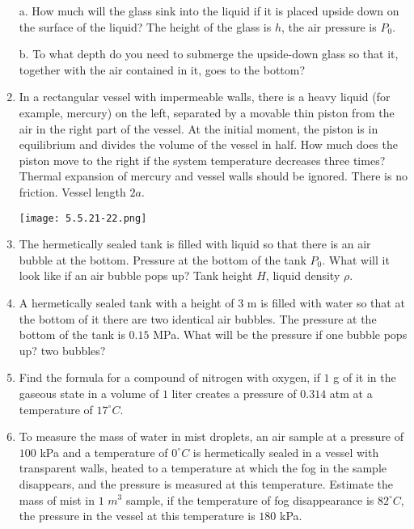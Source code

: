 \documentclass{article}
\begin{document}
\begin{enumerate}[label=5.5.\arabic*]
a. How much will the glass sink into the liquid if it is placed upside down on the surface of the liquid? The height of the glass is $h$, the air pressure is $P_0$.

b. To what depth do you need to submerge the upside-down glass so that it, together with the air contained in it, goes to the bottom?

\item In a rectangular vessel with impermeable walls, there is a heavy liquid (for example, mercury) on the left, separated by a movable thin piston from the air in the right part of the vessel. At the initial moment, the piston is in equilibrium and divides the volume of the vessel in half. How much does the piston move to the right if the system temperature decreases three times? Thermal expansion of mercury and vessel walls should be ignored. There is no friction. Vessel length $2a$.

\begin{center}
    \texttt{[image: 5.5.21-22.png]}
\end{center}


\item The hermetically sealed tank is filled with liquid so that there is an air bubble at the bottom. Pressure at the bottom of the tank $P_0$. What will it look like if an air bubble pops up? Tank height $H$, liquid density $\rho$.

\item A hermetically sealed tank with a height of $3$ m is filled with water so that at the bottom of it there are two identical air bubbles. The pressure at the bottom of the tank is $0.15$ MPa. What will be the pressure if one bubble pops up? two bubbles?

\item Find the formula for a compound of nitrogen with oxygen, if $1$ g of it in the gaseous state in a volume of $1$ liter creates a pressure of $0.314$ atm at a temperature of $17^\circ C$.

\item To measure the mass of water in mist droplets, an air sample at a pressure of $100$ kPa and a temperature of $0^\circ C$ is hermetically sealed in a vessel with transparent walls, heated to a temperature at which the fog in the sample disappears, and the pressure is measured at this temperature. Estimate the mass of mist in $1$ $m^3$ sample, if the temperature of fog disappearance is $82^\circ C$, the pressure in the vessel at this temperature is $180$ kPa.


\end{enumerate}
\end{document}

